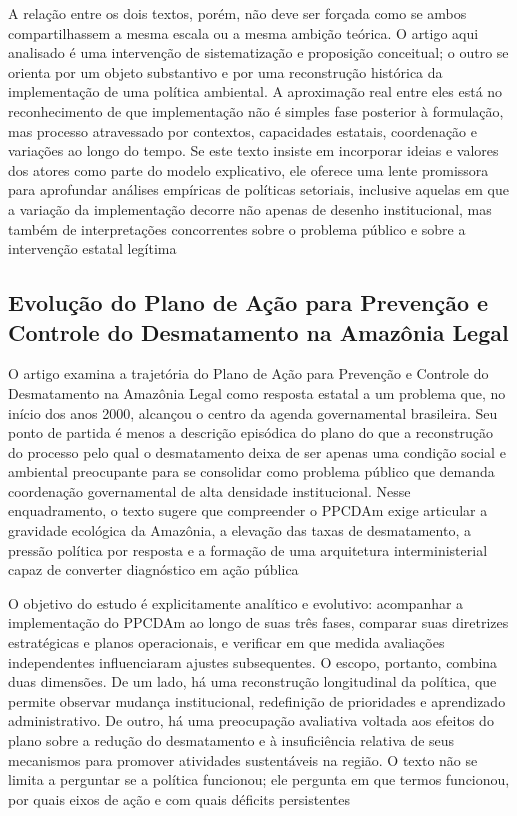 \documentclass[12pt,a4paper]{article}
\begin{document}
A relação entre os dois textos, porém, não deve ser forçada como se ambos compartilhassem a mesma escala ou a mesma ambição teórica. O artigo aqui analisado é uma intervenção de sistematização e proposição conceitual; o outro se orienta por um objeto substantivo e por uma reconstrução histórica da implementação de uma política ambiental. A aproximação real entre eles está no reconhecimento de que implementação não é simples fase posterior à formulação, mas processo atravessado por contextos, capacidades estatais, coordenação e variações ao longo do tempo. Se este texto insiste em incorporar ideias e valores dos atores como parte do modelo explicativo, ele oferece uma lente promissora para aprofundar análises empíricas de políticas setoriais, inclusive aquelas em que a variação da implementação decorre não apenas de desenho institucional, mas também de interpretações concorrentes sobre o problema público e sobre a intervenção estatal legítima\parencite{ascenzi2013_implementacao_politicas,mello2017_evolucao_plano}



\subsection{Evolução do Plano de Ação para Prevenção e Controle do Desmatamento na Amazônia Legal}
\label{sec:orgf097be2}

O artigo examina a trajetória do Plano de Ação para Prevenção e Controle do Desmatamento na Amazônia Legal como resposta estatal a um problema que, no início dos anos 2000, alcançou o centro da agenda governamental brasileira. Seu ponto de partida é menos a descrição episódica do plano do que a reconstrução do processo pelo qual o desmatamento deixa de ser apenas uma condição social e ambiental preocupante para se consolidar como problema público que demanda coordenação governamental de alta densidade institucional. Nesse enquadramento, o texto sugere que compreender o PPCDAm exige articular a gravidade ecológica da Amazônia, a elevação das taxas de desmatamento, a pressão política por resposta e a formação de uma arquitetura interministerial capaz de converter diagnóstico em ação pública \parencite{mello2017_evolucao_plano}

O objetivo do estudo é explicitamente analítico e evolutivo: acompanhar a implementação do PPCDAm ao longo de suas três fases, comparar suas diretrizes estratégicas e planos operacionais, e verificar em que medida avaliações independentes influenciaram ajustes subsequentes. O escopo, portanto, combina duas dimensões. De um lado, há uma reconstrução longitudinal da política, que permite observar mudança institucional, redefinição de prioridades e aprendizado administrativo. De outro, há uma preocupação avaliativa voltada aos efeitos do plano sobre a redução do desmatamento e à insuficiência relativa de seus mecanismos para promover atividades sustentáveis na região. O texto não se limita a perguntar se a política funcionou; ele pergunta em que termos funcionou, por quais eixos de ação e com quais déficits persistentes \parencite{mello2017_evolucao_plano}
\end{document}
